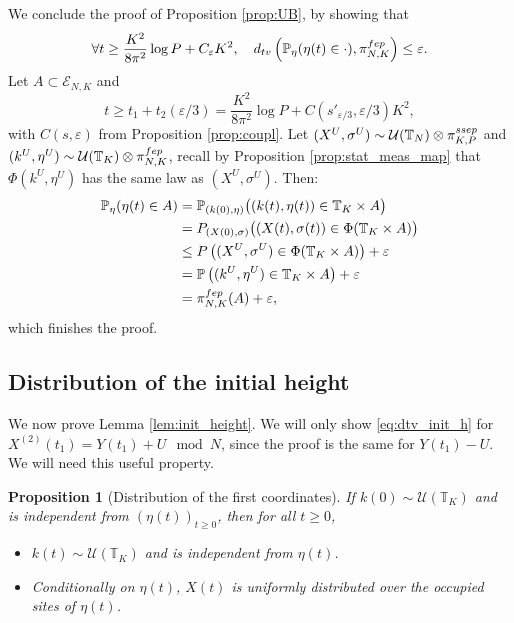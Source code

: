 \documentclass[11pt,a4paper]{article}
\newcommand{\T}{\mathbb{T}}
\newcommand{\PP}{\mathbb{P}}
\newcommand{\bP}{\textbf{P}}
\newcommand{\FEP}{\textsc{fep}}
\newcommand{\SSEP}{\textsc{ssep}}
\newtheorem{proposition}[theorem]{Proposition}
\newcommand{\eqs}[1]{\begin{equation}#1\end{equation}}
\begin{document}
We conclude the proof of Proposition \ref{prop:UB}, by showing that \eqs{\forall t \ge \frac{K^2}{8\pi^2}\log P + C_{\varepsilon} K^2, \quad d_{\textsc{tv}}\left(\PP_\eta(\eta(t) \in \cdot), \pi_{N,K}^{\FEP}\right) \le \varepsilon.} 
Let $A \subset \mathcal{E}_{N,K}$ and 
\eqs{t \ge t_1+t_2(\varepsilon/3)=\frac{K^2}{8\pi^2}\log P + C( s'_{\varepsilon/3}, \varepsilon/3) K^2,} with $C(s,\varepsilon)$ from Proposition \ref{prop:coupl}. Let $(X^U, \sigma^U) \sim \mathcal{U}(\T_N)\otimes \pi^{\SSEP}_{K,P}$ and $(k^U, \eta^U) \sim \mathcal{U}(\T_K)\otimes \pi^{\FEP}_{N,K}$, recall by Proposition \ref{prop:stat_meas_map} that $\Phi(k^U, \eta^U)$ has the same law as $(X^U, \sigma^U)$. Then:
\begin{align}
\PP_\eta(\eta(t) \in A) &= \PP_{(k(0),\eta)}\big((k(t), \eta(t))\in \T_K\times A\big) \nonumber\\
&= \bP_{(X(0),\sigma)}\big((X(t), \sigma(t))\in \Phi(\T_K\times A)\big) \nonumber\\
&\le \bP\left((X^U, \sigma^U)\in \Phi(\T_K\times A)\right) + \varepsilon \nonumber\\
&= \PP\left((k^U, \eta^U) \in \T_K \times A\right) + \varepsilon \nonumber\\
&= \pi^{\FEP}_{N,K}(A) + \varepsilon,
\end{align}
which finishes the proof.
\subsection{Distribution of the initial height} \label{subsec:init-h}
We now prove Lemma \ref{lem:init_height}. We will only show \eqref{eq:dtv_init_h} for $X^{(2)}(t_1) = Y(t_1) + U \mod N$, since the proof is the same for $Y(t_1) - U$. We will need this useful property.
 \begin{proposition}[Distribution of the first coordinates] \label{prop:dist_k}
 If $k(0) \sim \mathcal{U}(\T_K)$ and is independent from $(\eta(t))_{t\ge 0}$, then for all $t \ge 0$,
 \begin{itemize}
 \item $k(t)\sim \mathcal{U}(\T_K)$ and is independent from $\eta(t)$.
 \item Conditionally on $\eta(t)$, $X(t)$ is uniformly distributed over the occupied sites of $\eta(t)$.
 \end{itemize}
 \end{proposition}
\end{document}
